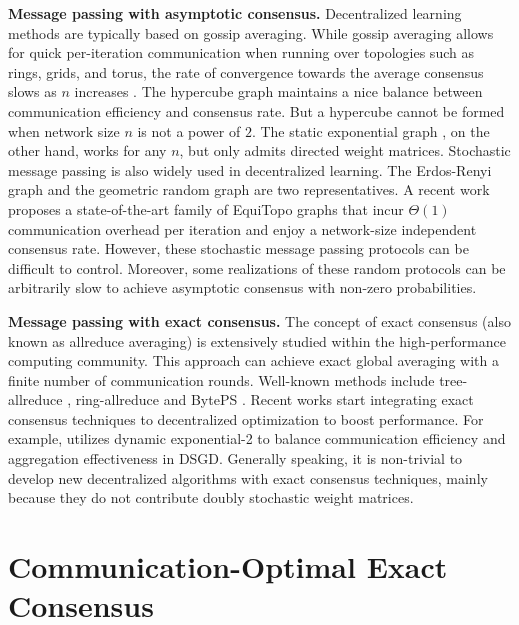 \documentclass{article}
\theoremstyle{plain}
\theoremstyle{definition}
\begin{document}
\textbf{Message passing with asymptotic consensus.} Decentralized learning methods are typically based on gossip averaging. {While gossip averaging allows for quick per-iteration communication when running over topologies such as rings, grids, and torus, the rate of convergence towards the average consensus slows as $n$ increases \cite{nedic2018network}.} The hypercube graph \cite{trevisan2017lecture} maintains a nice balance between communication efficiency and consensus rate. But a hypercube cannot be formed when network size $n$ is not a power of $2$. The static exponential graph \cite{ying2021exponential}, 
{on the other hand, works for any $n$, but only admits directed weight matrices.}
Stochastic message passing is also widely used in decentralized learning. The Erdos-Renyi graph \cite{nachmias2008critical,benjamini2014mixing,nedic2018network} and the geometric random graph \cite{beveridge2016best,boyd2005mixing} are two representatives. A recent work \cite{song2022communication} proposes a state-of-the-art family of EquiTopo graphs that incur $\Theta(1)$ communication overhead per iteration and enjoy a network-size independent consensus rate. However, these stochastic message passing protocols can be difficult to control. {Moreover,} some realizations of these random protocols can be arbitrarily slow to achieve asymptotic consensus with non-zero probabilities. 


\textbf{Message passing with exact consensus. }
{The concept of} exact consensus (also known as allreduce averaging) is extensively studied within the high-performance computing community. {This approach} can achieve exact global averaging with {a finite number of }communication rounds. Well-known methods include tree-allreduce \cite{ben2019demystifying}, ring-allreduce \cite{patarasuk2009bandwidth} and  BytePS \cite{jiang2020unified}. Recent works start integrating exact consensus techniques to decentralized optimization to boost performance. For example, \cite{ying2021exponential} utilizes  dynamic exponential-2 to balance communication efficiency and aggregation effectiveness in DSGD. Generally speaking, it is non-trivial to develop new decentralized algorithms with exact consensus techniques, mainly because they do not contribute doubly stochastic weight matrices. 



\section{Communication-Optimal Exact Consensus}
\end{document}
